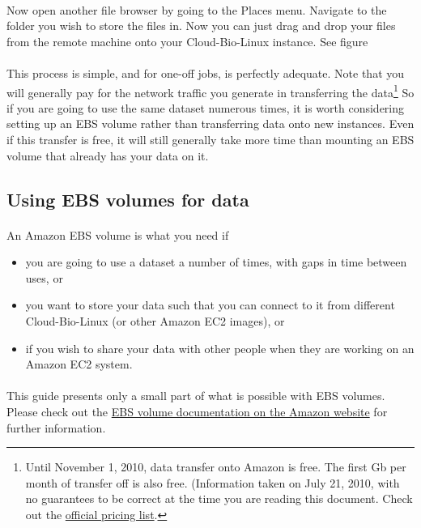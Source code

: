 \paragraph{}Now open another file browser by going to the Places menu. Navigate to the folder you wish to store the files in. Now you can just drag and drop your files from the remote machine onto your Cloud-Bio-Linux instance. See figure




\paragraph{}This process is simple, and for one-off jobs, is perfectly adequate. Note that you will generally pay for the network traffic you generate in transferring the data\footnote{Until November 1, 2010, data transfer onto Amazon is free. The first Gb per month of transfer off is also free. (Information taken on July 21, 2010, with no guarantees to be correct at the time you are reading this document. Check out the \href{http://aws.amazon.com/ec2/}{official pricing list}.} So if you are going to use the same dataset numerous times, it is worth considering setting up an EBS volume rather than transferring data onto new instances. Even if this transfer is free, it will still generally take more time than mounting an EBS volume that already has your data on it.

\subsection{Using EBS volumes for data}

\paragraph{}An Amazon EBS volume is what you need if 
\begin{itemize}
\item you are going to use a dataset a number of times, with gaps in time between uses, or
\item you want to store your data such that you can connect to it from different Cloud-Bio-Linux (or other Amazon EC2 images), or
\item if you wish to share your data with other people when they are working on an Amazon EC2 system.
\end{itemize}

\paragraph{}This guide presents only a small part of what is possible with EBS volumes. Please check out the \href{http://docs.amazonwebservices.com/AWSEC2/latest/UserGuide/ebs-api-overview.html}{EBS volume documentation on the Amazon website} for further information.

